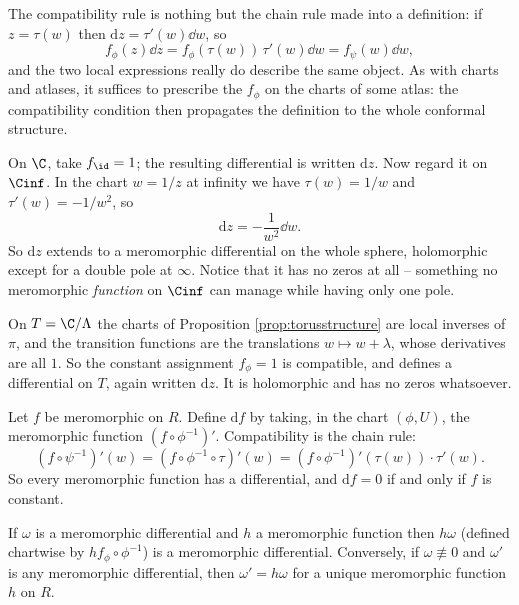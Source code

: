 The compatibility rule is nothing but the chain rule made into a definition: if
$z = \tau(w)$ then $\mathrm{d}z = \tau'(w)\dd w$, so
$$
f_\phi(z)\dd z = f_\phi(\tau(w))\,\tau'(w)\dd w = f_\psi(w)\dd w,
$$
and the two local expressions really do describe the same object. As with charts and
atlases, it suffices to prescribe the $f_\phi$ on the charts of some atlas: the
compatibility condition then propagates the definition to the whole conformal structure.

\begin{example}\label{ex:dzonsphere}
	On $\C$, take $f_{\id} = 1$; the resulting differential is written $\mathrm{d}z$. Now regard
	it on $\Cinf$. In the chart $w = 1/z$ at infinity we have $\tau(w) = 1/w$ and
	$\tau'(w) = -1/w^2$, so
	$$
	\mathrm{d}z = -\frac{1}{w^2}\dd w.
	$$
	So $\mathrm{d}z$ extends to a meromorphic differential on the whole sphere, holomorphic
	except for a double pole at $\infty$. Notice that it has no zeros at all -- something
	no meromorphic \emph{function} on $\Cinf$ can manage while having only one pole.
\end{example}

\begin{example}\label{ex:dzontorus}
	On $T = \C/\Lambda$ the charts of Proposition \ref{prop:torusstructure} are local
	inverses of $\pi$, and the transition functions are the translations
	$w \mapsto w + \lambda$, whose derivatives are all $1$. So the constant assignment
	$f_\phi = 1$ is compatible, and defines a differential on $T$, again written $\mathrm{d}z$.
	It is holomorphic and has no zeros whatsoever.
\end{example}

\begin{example}
	Let $f$ be meromorphic on $R$. Define $\mathrm{d}f$ by taking, in the chart $(\phi,U)$, the
	meromorphic function $(f\circ\phi^{-1})'$. Compatibility is the chain rule:
	$$
	(f\circ\psi^{-1})'(w) = \left(f\circ\phi^{-1}\circ\tau\right)'(w)
	= (f\circ\phi^{-1})'(\tau(w))\cdot\tau'(w).
	$$
	So every meromorphic function has a differential, and $\mathrm{d}f = 0$ if and only if $f$ is
	constant.
\end{example}

\begin{lemma}\label{lem:diffmodule}
	If $\omega$ is a meromorphic differential and $h$ a meromorphic function then $h\omega$
	(defined chartwise by $hf_\phi\circ\phi^{-1}$) is a meromorphic differential.
	Conversely, if $\omega \not\equiv 0$ and $\omega'$ is any meromorphic differential,
	then $\omega' = h\omega$ for a unique meromorphic function $h$ on $R$.
\end{lemma}

